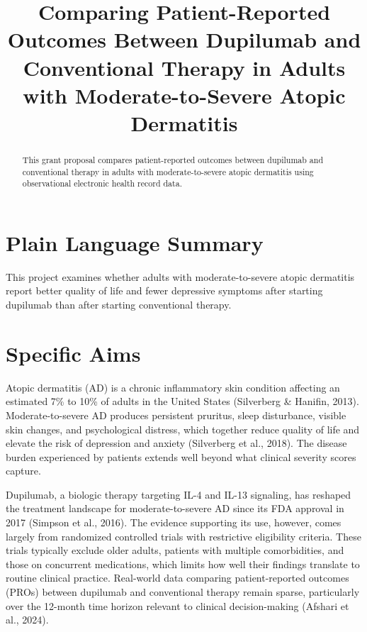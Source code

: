 \documentclass[
]{agujournal2019}
\begin{document}
\title{Comparing Patient-Reported Outcomes Between Dupilumab and
Conventional Therapy in Adults with Moderate-to-Severe Atopic
Dermatitis}




\begin{abstract}
This grant proposal compares patient-reported outcomes between dupilumab
and conventional therapy in adults with moderate-to-severe atopic
dermatitis using observational electronic health record data.
\end{abstract}

\section*{Plain Language Summary}
This project examines whether adults with moderate-to-severe atopic
dermatitis report better quality of life and fewer depressive symptoms
after starting dupilumab than after starting conventional therapy.




\section{Specific Aims}\label{specific-aims}

Atopic dermatitis (AD) is a chronic inflammatory skin condition
affecting an estimated 7\% to 10\% of adults in the United States
(Silverberg \& Hanifin, 2013). Moderate-to-severe AD produces persistent
pruritus, sleep disturbance, visible skin changes, and psychological
distress, which together reduce quality of life and elevate the risk of
depression and anxiety (Silverberg et al., 2018). The disease burden
experienced by patients extends well beyond what clinical severity
scores capture.

Dupilumab, a biologic therapy targeting IL-4 and IL-13 signaling, has
reshaped the treatment landscape for moderate-to-severe AD since its FDA
approval in 2017 (Simpson et al., 2016). The evidence supporting its
use, however, comes largely from randomized controlled trials with
restrictive eligibility criteria. These trials typically exclude older
adults, patients with multiple comorbidities, and those on concurrent
medications, which limits how well their findings translate to routine
clinical practice. Real-world data comparing patient-reported outcomes
(PROs) between dupilumab and conventional therapy remain sparse,
particularly over the 12-month time horizon relevant to clinical
decision-making (Afshari et al., 2024).
\end{document}
